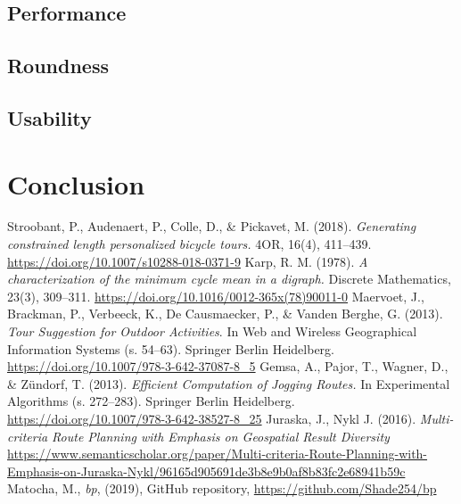 \documentclass{ctuthesis}
\begin{document}
\section{Performance}
\section{Roundness}
\section{Usability}



\chapter{Conclusion}

\begin{thebibliography}{1}
	Stroobant, P., Audenaert, P., Colle, D., \& Pickavet, M. (2018). \emph{Generating constrained length personalized bicycle tours.} 4OR, 16(4), 411–439. \url{https://doi.org/10.1007/s10288-018-0371-9} 
	Karp, R. M. (1978). \emph{A characterization of the minimum cycle mean in a digraph.} Discrete Mathematics, 23(3), 309–311. \url{https://doi.org/10.1016/0012-365x(78)90011-0} 
	Maervoet, J., Brackman, P., Verbeeck, K., De Causmaecker, P., \& Vanden Berghe, G. (2013). \emph{Tour Suggestion for Outdoor Activities}. In Web and Wireless Geographical Information Systems (s. 54–63). Springer Berlin Heidelberg. \url{https://doi.org/10.1007/978-3-642-37087-8_5} 
	Gemsa, A., Pajor, T., Wagner, D., \& Zündorf, T. (2013). \emph{Efficient Computation of Jogging Routes.} In Experimental Algorithms (s. 272–283). Springer Berlin Heidelberg. \url{https://doi.org/10.1007/978-3-642-38527-8_25} 
	 Juraska, J., Nykl J. (2016). \emph{Multi-criteria Route Planning with Emphasis on Geospatial Result Diversity} \url{https://www.semanticscholar.org/paper/Multi-criteria-Route-Planning-with-Emphasis-on-Juraska-Nykl/96165d905691de3b8e9b0af8b83fc2e68941b59c}
	 Matocha, M., \emph{bp}, (2019), GitHub repository, \url{https://github.com/Shade254/bp}
\end{thebibliography}
\end{document}
